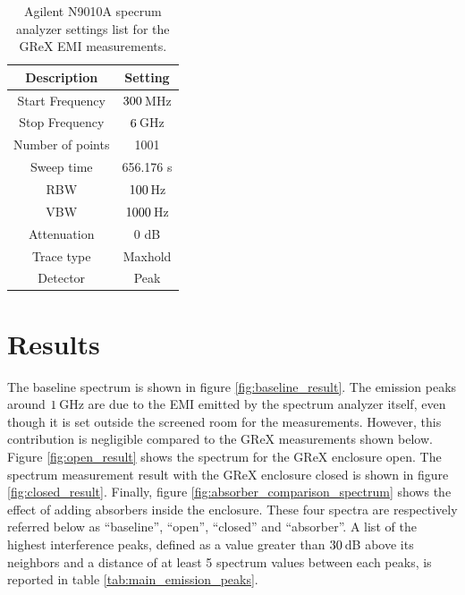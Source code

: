 \documentclass[12pt,a4paper,oneside]{article}
\begin{document}
\begin{table}[]
    \centering
   
    \begin{tabular}{|c|c|}
    \hline
         \cellcolor[gray]{0.85} Description & \cellcolor[gray]{0.85} Setting \\ \hline
          Start Frequency & $300\thinspace$MHz \\ \hline
          Stop Frequency & $6\thinspace$GHz \\ \hline
          Number of points & 1001 \\ \hline
          Sweep time & 656.176 s\\ \hline
          RBW & $100\thinspace$Hz \\ \hline
          VBW & $1000\thinspace$Hz \\ \hline
          Attenuation & 0 dB\\ \hline
          Trace type & Maxhold \\ \hline
          Detector & Peak \\ \hline         
    \end{tabular}
    \caption{ Agilent N9010A specrum analyzer settings list for the GReX EMI measurements.}
    \label{tab:spectrum_analyzer_settings}
\end{table}
\section{Results}
\label{sec:Results}

The baseline spectrum is shown in figure \ref{fig:baseline_result}. The emission peaks around $1\thinspace$GHz are due to the EMI emitted by the spectrum analyzer itself, even though it is set outside the screened room for the measurements. However, this contribution is negligible compared to the GReX measurements shown below. Figure \ref{fig:open_result} shows the spectrum for the GReX enclosure open. The spectrum measurement result with the GReX enclosure closed is shown in figure \ref{fig:closed_result}. Finally, figure \ref{fig:absorber_comparison_spectrum} shows the effect of adding absorbers inside the enclosure. These four spectra are respectively referred below as ``baseline'', ``open'', ``closed'' and ``absorber''. A list of the highest interference peaks, defined as a value greater than $30\thinspace$dB above its neighbors and a distance of at least 5 spectrum values between each peaks, is reported in table \ref{tab:main_emission_peaks}.
\end{document}
